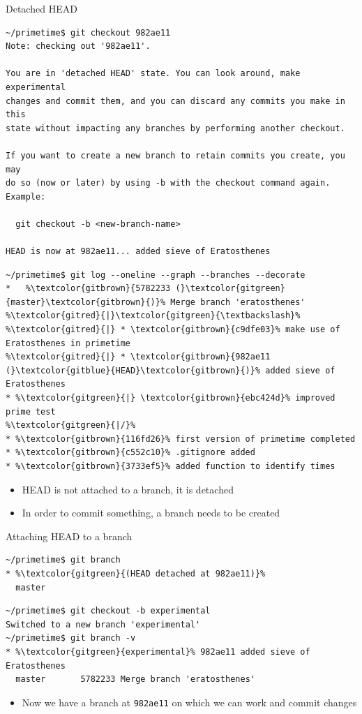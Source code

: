 \documentclass[svgnames]{beamer}
\begin{document}
\begin{frame}[fragile]{Detached HEAD}
 \begin{lstlisting}[basicstyle={\ttfamily\tiny}]
~/primetime$ git checkout 982ae11
Note: checking out '982ae11'.

You are in 'detached HEAD' state. You can look around, make experimental
changes and commit them, and you can discard any commits you make in this
state without impacting any branches by performing another checkout.

If you want to create a new branch to retain commits you create, you may
do so (now or later) by using -b with the checkout command again. Example:

  git checkout -b <new-branch-name>

HEAD is now at 982ae11... added sieve of Eratosthenes
 \end{lstlisting}

 \begin{lstlisting}[escapechar=\%]
~/primetime$ git log --oneline --graph --branches --decorate
*   %\textcolor{gitbrown}{5782233 (}\textcolor{gitgreen}{master}\textcolor{gitbrown}{)}% Merge branch 'eratosthenes'
%\textcolor{gitred}{|}\textcolor{gitgreen}{\textbackslash}%  
%\textcolor{gitred}{|} * \textcolor{gitbrown}{c9dfe03}% make use of Eratosthenes in primetime
%\textcolor{gitred}{|} * \textcolor{gitbrown}{982ae11 (}\textcolor{gitblue}{HEAD}\textcolor{gitbrown}{)}% added sieve of Eratosthenes
* %\textcolor{gitgreen}{|} \textcolor{gitbrown}{ebc424d}% improved prime test
%\textcolor{gitgreen}{|/}%  
* %\textcolor{gitbrown}{116fd26}% first version of primetime completed
* %\textcolor{gitbrown}{c552c10}% .gitignore added
* %\textcolor{gitbrown}{3733ef5}% added function to identify times
 \end{lstlisting}

 \begin{itemize}
  \item HEAD is not attached to a branch, it is detached
  \item In order to commit something, a branch needs to be created
 \end{itemize}
\end{frame}

\begin{frame}[fragile]{Attaching HEAD to a branch}
 \begin{lstlisting}[escapechar=\%]
~/primetime$ git branch
* %\textcolor{gitgreen}{(HEAD detached at 982ae11)}%
  master
 \end{lstlisting}
 \begin{lstlisting}[escapechar=\%]
~/primetime$ git checkout -b experimental
Switched to a new branch 'experimental'
~/primetime$ git branch -v
* %\textcolor{gitgreen}{experimental}% 982ae11 added sieve of Eratosthenes
  master       5782233 Merge branch 'eratosthenes'
 \end{lstlisting}
 \begin{itemize}
  \item Now we have a branch at \texttt{982ae11} on which we can work and commit
        changes
 \end{itemize}
\end{frame}
\end{document}
